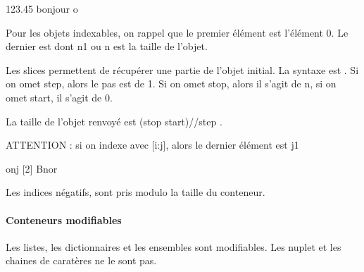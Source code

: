 \documentclass[letterpaper,10pt,english]{sphinxhowto}
\begin{document}
\begin{sphinxVerbatim}[commandchars=\\\{\}]
123.45
bonjour
o
\end{sphinxVerbatim}

\sphinxAtStartPar
Pour les objets indexables, on rappel que le premier élément est l’élément 0. Le dernier est dont n\sphinxhyphen{}1 ou n est la taille de l’objet.

\sphinxAtStartPar
Les slices permettent de récupérer une partie de l’objet initial.
La syntaxe est . Si on omet step, alors le pas est de 1. Si on omet stop, alors il s’agit de n, si on omet start, il s’agit de 0.

\sphinxAtStartPar
La taille de l’objet renvoyé est (stop \sphinxhyphen{} start)//step .

\sphinxAtStartPar
ATTENTION : si on indexe avec {[}i:j{]}, alors le dernier élément est j\sphinxhyphen{}1

\begin{sphinxVerbatim}[commandchars=\\\{\}]
\PYG{p}{[}\PYG{p}{]}
\PYG{p}{[}\PYG{p}{]}
\PYG{p}{[}\PYG{p}{]}
\end{sphinxVerbatim}

\begin{sphinxVerbatim}[commandchars=\\\{\}]
onj
[2]
Bnor
\end{sphinxVerbatim}

\sphinxAtStartPar
Les indices négatifs, sont pris modulo la taille du conteneur.

\begin{sphinxVerbatim}[commandchars=\\\{\}]
\PYG{p}{[}\PYG{p}{]} 
\end{sphinxVerbatim}


\paragraph{Conteneurs modifiables}
\label{\detokenize{cours3_conteneur_cours:conteneurs-modifiables}}
\sphinxAtStartPar
Les listes, les dictionnaires et les ensembles sont modifiables. Les n\sphinxhyphen{}uplet et les chaines de caratères ne le sont pas.
\end{document}
